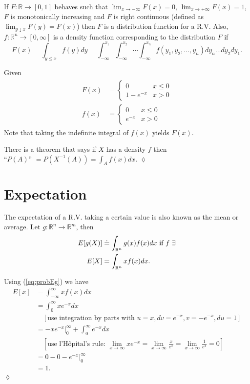 If $F: \mathbb{R} \to [0,1]$ behaves such that $\lim_{x \to -\infty} F(x) = 0$, $\lim_{x \to +\infty} F(x) = 1$, $F$ is monotonically increasing and $F$ is right continuous (defined as $\lim_{y \downarrow x} F(y) = F(x)$) then $F$ is a distribution function for a R.V.
Also, $f:\mathbb{R}^n \to [0,\infty]$ is a density function corresponding to the distribution $F$ if
$$F(x) = \int_{y \leq x} f(y)dy = \int_{-\infty}^{x_1} \int_{-\infty}^{x_2}\cdots \int_{-\infty}^{x_n} f(y_1,y_2,\ldots,y_n)dy_n\ldots dy_2dy_1.$$

\begin{example}
Given
\begin{align}
\label{eq:probEg}
\begin{split}
F(x) &= \begin{cases} 0 & x \leq 0 \\ 1-e^{-x} & x > 0 \end{cases} \\
f(x) &= \begin{cases} 0 & x \leq 0 \\ e^{-x} & x > 0 \end{cases}
\end{split}
\end{align}
Note that taking the indefinite integral of $f(x)$ yields $F(x)$.

There is a theorem that says if $X$ has a density $f$ then \\
``$P(A)$'' $= P\left(X^{-1}(A)\right) = \int_A f(x)dx$.
$\lozenge$
\end{example}

\section{Expectation}
The expectation of a R.V. taking a certain value is also known as the mean or average.
Let $g: \mathbb{R}^n \to \mathbb{R}^m$, then
\begin{align*}
E[g(X)] &\doteq \int_{\mathbb{R}^n} g(x)f(x)dx \textnormal{~if~} f~\exists \\
E[X] &= \int_{\mathbb{R}^n}xf(x)dx.
\end{align*}

\begin{example}
Using (\ref{eq:probEg}) we have
\begin{align*}
E[x] &= \int_{-\infty}^\infty xf(x)dx \\
&= \int_0^\infty xe^{-x}dx \\
&\quad [\text{use integration by parts with } u = x, dv = e^{-x}, v = -e^{-x}, du = 1] \\
&= -xe^{-x}\rvert_0^\infty + \int_0^\infty e^{-x}dx \\
&\quad [\text{use l'H\^opital's rule: } \lim_{x \to \infty} xe^{-x} = \lim_{x \to \infty} \frac{x}{e^x} = \lim_{x \to \infty} \frac{1}{e^x} = 0] \\
&= 0 - 0 - e^{-x}\rvert_0^\infty \\
&= 1.
\end{align*}
$\lozenge$
\end{example}

